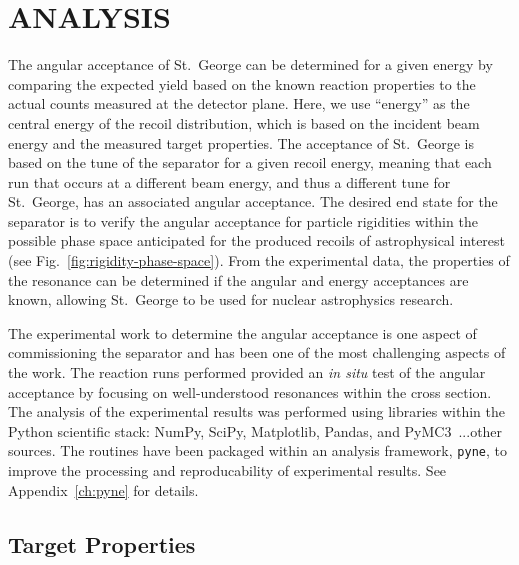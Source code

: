 
\chapter{ANALYSIS}
\label{ch:analysis}

The angular acceptance of St.\ George can be determined for a given energy by
comparing the expected yield based on the known reaction properties to the
actual counts measured at the detector plane. Here, we use ``energy'' as the
central energy of the recoil distribution, which is based on the incident beam
energy and the measured target properties. The acceptance of St.\ George is
based on the tune of the separator for a given recoil energy, meaning that
each run that occurs at a different beam energy, and thus a different tune for
St.\ George, has an associated angular acceptance. The desired end state for
the separator is to verify the angular acceptance for particle rigidities
within the possible phase space anticipated for the produced recoils of
astrophysical interest (see Fig.~\ref{fig:rigidity-phase-space}). From the
experimental data, the properties of the resonance can be determined if the
angular and energy acceptances are known, allowing St.\ George to be used for
nuclear astrophysics research.

The experimental work to determine the angular acceptance is one aspect of
commissioning the separator and has been one of the most challenging aspects of
the work. The \alpa{} reaction runs performed provided an \emph{in situ} test
of the angular acceptance by focusing on well-understood resonances within the
cross section. The analysis of the experimental results was performed using
libraries within the Python scientific stack: NumPy, SciPy, Matplotlib, Pandas,
and PyMC3~\cite{NumPy, SciPy}...other sources. The routines have been packaged
within an analysis framework, \verb+pyne+, to improve the processing and
reproducability of experimental results. See Appendix~\ref{ch:pyne} for
details.


\section{Target Properties}
\label{sec:target-properties}


